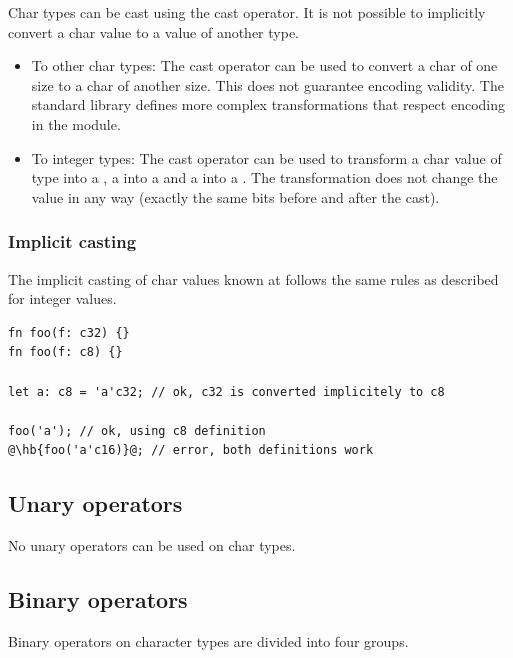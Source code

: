 Char types can be cast using the cast operator. It is not possible to implicitly convert a char value to a value of another type.

\begin{itemize}
  \setlength\itemsep{-4pt}
\item To other char types: The cast operator can be used to convert a char of
  one size to a char of another size. This does not guarantee encoding validity.
  The standard library defines more complex transformations that respect
  encoding in the  module.

\item To integer types: The cast operator can be used to transform a char value
  of type  into a , a  into a  and
  a  into a . The transformation does not change the
  value in any way (exactly the same bits before and after the cast).

\end{itemize}


\subsubsection{Implicit casting}

The implicit casting of char values known at  follows the same
rules as described for integer  values.

\begin{lstlisting}[style=coloredverbatimError, escapechar=@]
fn foo(f: c32) {}
fn foo(f: c8) {}

let a: c8 = 'a'c32; // ok, c32 is converted implicitely to c8

foo('a'); // ok, using c8 definition
@\hb{foo('a'c16)}@; // error, both definitions work
\end{lstlisting}

\subsection{Unary operators}
\label{sec:org78546fb}

No unary operators can be used on char types.

\subsection{Binary operators}
\label{sec:orge863f7d}

Binary operators on character types are divided into four groups.


